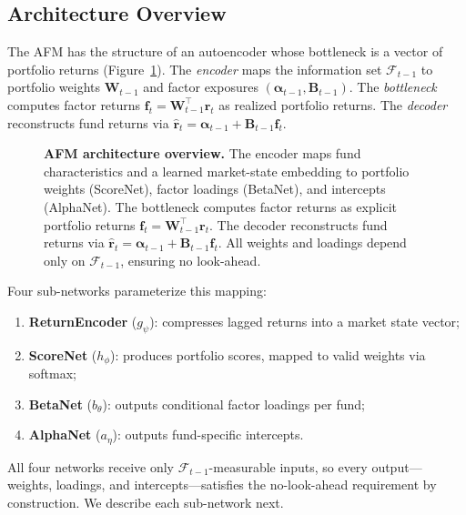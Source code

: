 \subsection{Architecture Overview}\label{sec:architecture}

The AFM has the structure of an autoencoder whose bottleneck is a vector of portfolio returns (Figure~\ref{fig:architecture}). The \emph{encoder} maps the information set $\mathcal{F}_{t-1}$ to portfolio weights $\mathbf{W}_{t-1}$ and factor exposures $(\boldsymbol{\alpha}_{t-1}, \mathbf{B}_{t-1})$. The \emph{bottleneck} computes factor returns $\mathbf{f}_t = \mathbf{W}_{t-1}^\top \mathbf{r}_t$ as realized portfolio returns. The \emph{decoder} reconstructs fund returns via $\hat{\mathbf{r}}_t = \boldsymbol{\alpha}_{t-1} + \mathbf{B}_{t-1} \mathbf{f}_t$.

\begin{figure}[t]
\centering
\fbox{\rule{0pt}{2in}\rule{0.9\linewidth}{0pt}} %
\caption{\textbf{AFM architecture overview.} The encoder maps fund characteristics and a learned market-state embedding to portfolio weights (ScoreNet), factor loadings (BetaNet), and intercepts (AlphaNet). The bottleneck computes factor returns as explicit portfolio returns $\mathbf{f}_t = \mathbf{W}_{t-1}^\top \mathbf{r}_t$. The decoder reconstructs fund returns via $\hat{\mathbf{r}}_t = \boldsymbol{\alpha}_{t-1} + \mathbf{B}_{t-1} \mathbf{f}_t$. All weights and loadings depend only on $\mathcal{F}_{t-1}$, ensuring no look-ahead.}
\label{fig:architecture}
\end{figure}

Four sub-networks parameterize this mapping:
\begin{enumerate}[leftmargin=*,nosep]
    \item \textbf{ReturnEncoder} ($g_\psi$): compresses lagged returns into a market state vector;
    \item \textbf{ScoreNet} ($h_\phi$): produces portfolio scores, mapped to valid weights via softmax;
    \item \textbf{BetaNet} ($b_\theta$): outputs conditional factor loadings per fund;
    \item \textbf{AlphaNet} ($a_\eta$): outputs fund-specific intercepts.
\end{enumerate}
All four networks receive only $\mathcal{F}_{t-1}$-measurable inputs, so every output---weights, loadings, and intercepts---satisfies the no-look-ahead requirement by construction. We describe each sub-network next.


